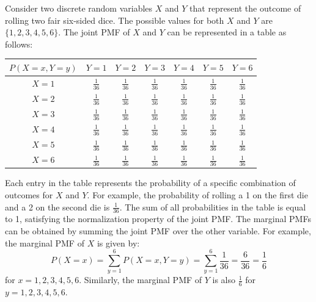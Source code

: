 \documentclass[openany]{book}
\begin{document}
\begin{example}
    Consider two discrete random variables $X$ and $Y$ that represent the outcome of rolling two fair six-sided dice. The possible values for both $X$ and $Y$ are $\{1, 2, 3, 4, 5, 6\}$. The joint PMF of $X$ and $Y$ can be represented in a table as follows:
    \begin{table}[H]
        \centering
        \begin{tabular}{c|cccccc}
            $P(X = x, Y = y)$ & $Y=1$ & $Y=2$ & $Y=3$ & $Y=4$ & $Y=5$ & $Y=6$ \\
            \hline
            $X=1$ & $\frac{1}{36}$ & $\frac{1}{36}$ & $\frac{1}{36}$ & $\frac{1}{36}$ & $\frac{1}{36}$ & $\frac{1}{36}$ \\
            $X=2$ & $\frac{1}{36}$ & $\frac{1}{36}$ & $\frac{1}{36}$ & $\frac{1}{36}$ & $\frac{1}{36}$ & $\frac{1}{36}$ \\
            $X=3$ & $\frac{1}{36}$ & $\frac{1}{36}$ & $\frac{1}{36}$ & $\frac{1}{36}$ & $\frac{1}{36}$ & $\frac{1}{36}$ \\
            $X=4$ & $\frac{1}{36}$ & $\frac{1}{36}$ & $\frac{1}{36}$ & $\frac{1}{36}$ & $\frac{1}{36}$ & $\frac{1}{36}$ \\
            $X=5$ & $\frac{1}{36}$ & $\frac{1}{36}$ & $\frac{1}{36}$ & $\frac{1}{36}$ & $\frac{1}{36}$ & $\frac{1}{36}$ \\
            $X=6$ & $\frac{1}{36}$ & $\frac{1}{36}$ & $\frac{1}{36}$ & $\frac{1}{36}$ & $\frac{1}{36}$ & $\frac{1}{36}$ \\
        \end{tabular}
    \end{table}
    Each entry in the table represents the probability of a specific combination of outcomes for $X$ and $Y$. For example, the probability of rolling a 1 on the first die and a 2 on the second die is $\frac{1}{36}$. The sum of all probabilities in the table is equal to 1, satisfying the normalization property of the joint PMF. The marginal PMFs can be obtained by summing the joint PMF over the other variable. For example, the marginal PMF of $X$ is given by:
    $$P(X = x) = \sum_{y=1}^{6} P(X = x, Y = y) = \sum_{y=1}^{6} \frac{1}{36} = \frac{6}{36} = \frac{1}{6}$$
    for $x = 1, 2, 3, 4, 5, 6$. Similarly, the marginal PMF of $Y$ is also $\frac{1}{6}$ for $y = 1, 2, 3, 4, 5, 6$.
\end{example} \\
\end{document}

